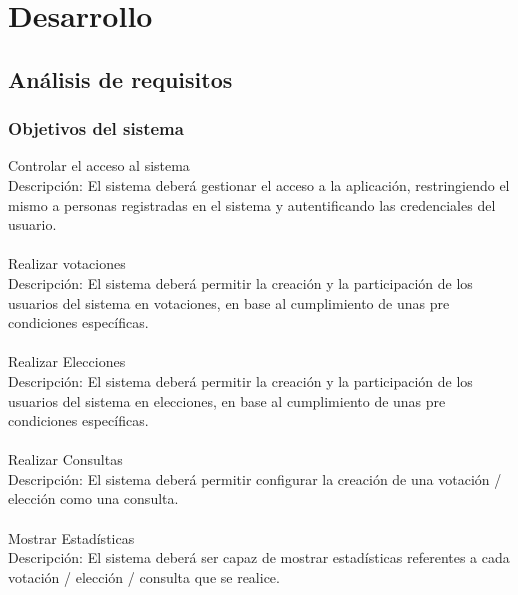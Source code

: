 \documentclass[12pt,letterpaper]{report}
\begin{document}
\chapter{Desarrollo}
\section{Análisis de requisitos}
	\subsection{Objetivos del sistema}
		\noindent Controlar el acceso al sistema\\
		Descripción: El sistema deberá gestionar el acceso a la aplicación, restringiendo el mismo a personas registradas en el sistema y autentificando las credenciales del usuario.
		\\~\\
		Realizar votaciones\\
		Descripción: El sistema deberá permitir la creación y la participación de los usuarios del sistema en votaciones, en base al cumplimiento de unas pre condiciones específicas.
		\\~\\
		Realizar Elecciones \\
		Descripción: 
		El sistema deberá permitir la creación y la participación de los usuarios del sistema en elecciones, en base al cumplimiento de unas pre condiciones específicas.
		\\~\\ 
		Realizar Consultas\\
		Descripción: El sistema deberá permitir configurar la creación de una votación / elección como una consulta.
		\\~\\  
		Mostrar Estadísticas\\
		Descripción: El sistema deberá ser capaz de mostrar estadísticas referentes a cada votación / elección / consulta que se realice.\\   
		
\end{document}
